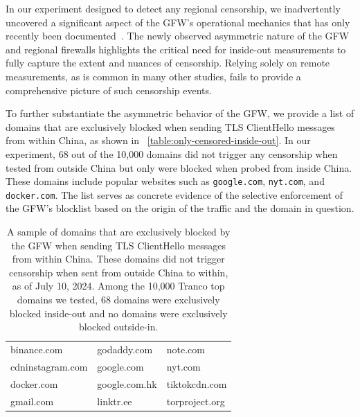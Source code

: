 \documentclass[conference,compsoc]{IEEEtran}
\begin{document}
In our experiment designed to detect any regional censorship, we inadvertently uncovered a significant aspect of the GFW's operational mechanics that has only recently been documented~\cite{Hoang2024a}. The newly observed asymmetric nature of the GFW and regional firewalls highlights the critical need for inside-out measurements to fully capture the extent and nuances of censorship. Relying solely on remote measurements, as is common in many other studies, fails to provide a comprehensive picture of such censorship events.

To further substantiate the asymmetric behavior of the GFW, we provide a list of domains that are exclusively blocked when sending TLS ClientHello messages from within China, as shown in ~\autoref{table:only-censored-inside-out}. In our experiment, 68 out of the 10,000 domains did not trigger any censorship when tested from outside China but only were blocked when probed from inside China. These domains include popular websites such as \texttt{google.com}, \texttt{nyt.com}, and \texttt{docker.com}. The list serves as concrete evidence of the selective enforcement of the GFW's blocklist based on the origin of the traffic and the domain in question.




\begin{table}[t]
  \centering
  \small
  \caption{
    A sample of domains that are exclusively blocked by the GFW when sending TLS ClientHello messages from within China.
    These domains did not trigger censorship when sent from outside China to within,
    as of July 10, 2024.
  Among the 10,000 Tranco top domains we tested, 68 domains were exclusively blocked inside-out
  and no domains were exclusively blocked outside-in.
  }
  \begin{tabular}{l|l|l}
    \toprule
    binance.com      & godaddy.com   & note.com       \\
    cdninstagram.com & google.com    & nyt.com        \\
    docker.com       & google.com.hk & tiktokcdn.com  \\
    gmail.com        & linktr.ee     & torproject.org \\
    \bottomrule
\end{tabular}
  \label{table:only-censored-inside-out}
\end{table}
\end{document}
